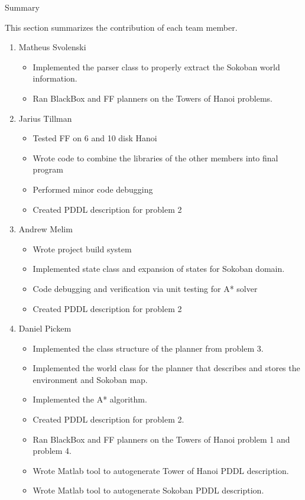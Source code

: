 \documentclass[12pt]{article}
\begin{document}
\newpage
\begin{center}
\Huge{Summary} 
\end{center}
This section summarizes the contribution of each team member. 

\begin{enumerate}
  \item Matheus Svolenski
    \begin{itemize}
     \item Implemented the parser class to properly extract the Sokoban world information.
     \item Ran BlackBox and FF planners on the Towers of Hanoi problems.
    \end{itemize}

  \item Jarius Tillman
   \begin{itemize}
     \item Tested FF on 6 and 10 disk Hanoi
     \item Wrote code to combine the libraries of the other members into final program
     \item Performed minor code debugging
     \item Created PDDL description for problem 2
    \end{itemize}
  \item Andrew Melim
    \begin{itemize}
     \item Wrote project build system
     \item Implemented state class and expansion of states for Sokoban domain.
     \item Code debugging and verification via unit testing for A* solver
     \item Created PDDL description for problem 2
    \end{itemize}

  \item Daniel Pickem
    \begin{itemize}
     \item Implemented the class structure of the planner from problem 3.
     \item Implemented the world class for the planner that describes and stores the environment and Sokoban map.
     \item Implemented the A* algorithm.
     \item Created PDDL description for problem 2.
     \item Ran BlackBox and FF planners on the Towers of Hanoi problem 1 and problem 4.
     \item Wrote Matlab tool to autogenerate Tower of Hanoi PDDL description.
     \item Wrote Matlab tool to autogenerate Sokoban PDDL description.
    \end{itemize}
\end{enumerate}
\end{document}
